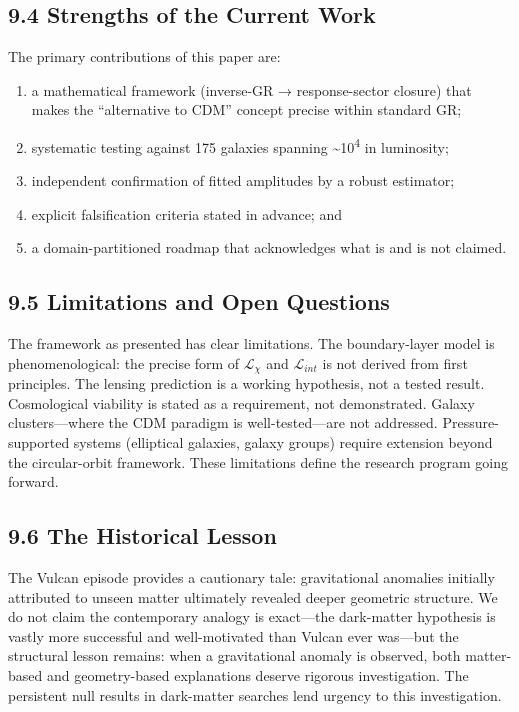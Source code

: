 \subsection{9.4 Strengths of the Current Work}\label{strengths-of-the-current-work}

The primary contributions of this paper are:

\begin{enumerate}
\def\labelenumi{(\roman{enumi})}
\item
  a mathematical framework (inverse-GR → response-sector closure) that makes the ``alternative to CDM'' concept precise within standard GR;
\item
  systematic testing against 175 galaxies spanning \textasciitilde10\textsuperscript{4} in luminosity;
\item
  independent confirmation of fitted amplitudes by a robust estimator;
\item
  explicit falsification criteria stated in advance; and
\item
  a domain-partitioned roadmap that acknowledges what is and is not claimed.
\end{enumerate}

\subsection{9.5 Limitations and Open Questions}\label{limitations-and-open-questions}

The framework as presented has clear limitations. The boundary-layer model is phenomenological: the precise form of \(\mathcal{L}_{\chi}\) and \(\mathcal{L}_{int}\) is not derived from first principles. The lensing prediction is a working hypothesis, not a tested result. Cosmological viability is stated as a requirement, not demonstrated. Galaxy clusters---where the CDM paradigm is well-tested---are not addressed. Pressure-supported systems (elliptical galaxies, galaxy groups) require extension beyond the circular-orbit framework. These limitations define the research program going forward.

\subsection{9.6 The Historical Lesson}\label{the-historical-lesson}

The Vulcan episode provides a cautionary tale: gravitational anomalies initially attributed to unseen matter ultimately revealed deeper geometric structure. We do not claim the contemporary analogy is exact---the dark-matter hypothesis is vastly more successful and well-motivated than Vulcan ever was---but the structural lesson remains: when a gravitational anomaly is observed, both matter-based and geometry-based explanations deserve rigorous investigation. The persistent null results in dark-matter searches lend urgency to this investigation.

